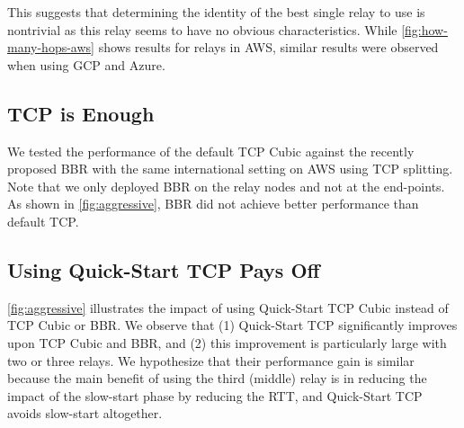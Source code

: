 \documentclass{hotnets17}
\newcommand{\mycomm}[3]{{\color{#2} \textbf{[#1: #3]}}}
\newcommand{\mycomm}[3]{}
\newcommand{\AB}[1]{\mycomm{AB}{Orange}{#1}}
\newcommand{\NR}[1]{\mycomm{NR}{OliveGreen}{#1}}
\begin{document}
This suggests that determining the identity of the best single relay to use is nontrivial as this relay seems to have no obvious characteristics. While \autoref{fig:how-many-hops-aws} shows results for relays in AWS, similar results were observed when using GCP and Azure.

\subsection{TCP is Enough} 
We tested the performance of the default TCP Cubic against the recently proposed BBR with the same international setting on AWS using TCP splitting. Note that we only deployed BBR  on the relay nodes and not at the end-points.
As shown in \autoref{fig:aggressive},
BBR did not achieve better performance than default TCP.



\subsection{Using Quick-Start TCP Pays Off}\label{subsec:quick-start}
\autoref{fig:aggressive} illustrates the impact of using Quick-Start TCP Cubic  instead of TCP Cubic or BBR.
We observe that (1) Quick-Start TCP significantly improves upon TCP Cubic and BBR, and (2) this improvement is particularly large with two or three relays. We hypothesize that their performance gain is similar because the main benefit of using the third (middle) relay is in reducing the impact of the slow-start phase by reducing the RTT, and Quick-Start TCP avoids slow-start altogether.
\end{document}

